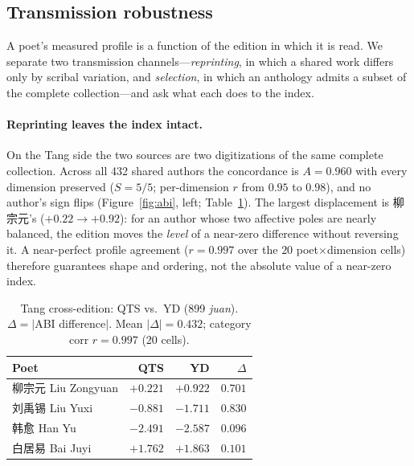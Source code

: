 \documentclass[10pt]{article}
\begin{document}
\subsection{Transmission robustness}
\label{sec:robust}

A poet's measured profile is a function of the edition in which it is read. We
separate two transmission channels---\emph{reprinting}, in which a shared work
differs only by scribal variation, and \emph{selection}, in which an anthology admits
a subset of the complete collection---and ask what each does to the index.

\paragraph{Reprinting leaves the index intact.} On the Tang side the two sources are
two digitizations of the same complete collection. Across all 432 shared authors the
concordance is $A{=}0.960$ with every dimension preserved ($S{=}5/5$; per-dimension
$r$ from $0.95$ to $0.98$), and no author's sign flips (Figure~\ref{fig:abi}, left;
Table~\ref{tab:tang}). The largest displacement is 柳宗元's ($+0.22\to+0.92$): for an
author whose two affective poles are nearly balanced, the edition moves the
\emph{level} of a near-zero difference without reversing it. A near-perfect profile
agreement ($r{=}0.997$ over the $20$ poet$\times$dimension cells) therefore guarantees
shape and ordering, not the absolute value of a near-zero index.

\begin{table}[H]
\centering\footnotesize
\caption{Tang cross-edition: QTS vs.\ YD (899 \emph{juan}). $\Delta{=}|$ABI
difference$|$. Mean $|\Delta|{=}0.432$; category corr $r{=}0.997$ (20 cells).}
\label{tab:tang}
\begin{tabular}{lrrr}
\toprule
Poet & QTS & YD & $\Delta$\\
\midrule
柳宗元 Liu Zongyuan & $+0.221$ & $+0.922$ & $0.701$\\
刘禹锡 Liu Yuxi & $-0.881$ & $-1.711$ & $0.830$\\
韩愈 Han Yu & $-2.491$ & $-2.587$ & $0.096$\\
白居易 Bai Juyi & $+1.762$ & $+1.863$ & $0.101$\\
\bottomrule
\end{tabular}
\end{table}
\end{document}

